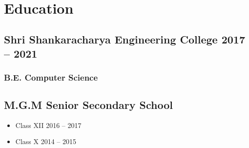 \documentclass[11pt]{article}
\begin{document}
\section{Education}

\subsection{Shri Shankaracharya Engineering College \hfill 2017 -- 2021}
\subsubsection{B.E. Computer Science}

\subsection{M.G.M Senior Secondary School}
\begin{itemize}
\item Class XII \hfill 2016 -- 2017
\item Class X \hfill 2014 -- 2015
\end{itemize}
\end{document}

